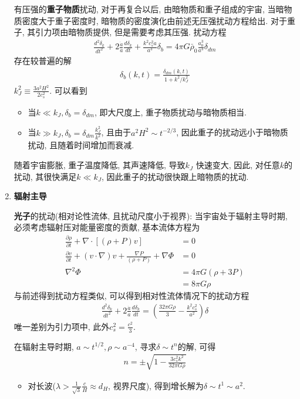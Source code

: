 \begin{enumerate}
    \subitem 有压强的\textbf{重子物质}扰动, 对于再复合以后, 由暗物质和重子组成的宇宙, 当暗物质密度大于重子密度时, 暗物质的密度演化由前述无压强扰动方程给出. 对于重子, 其引力项由暗物质提供, 但是需要考虑其压强. 扰动方程
    \begin{align*}
        \frac{d^2\delta_k}{d t^2}+2\frac{\dot{a}}{a}\frac{d\delta_k}{dt}+\frac{k^2c_s^2a}{a^3}\delta_b=4\pi G \bar\rho_0\frac{a_0^3}{a^3}\delta_{dm}
    \end{align*}
    存在较普遍的解
    \begin{align*}
        \delta_b(k,t)=\frac{\delta_{dm}(k,t)}{1+k^2/k_J^2}
    \end{align*}
    $\displaystyle k_J^2\equiv \frac{3a^2H^2}{2c_s^2}$. 可以看到
    \begin{itemize}
        \item 当$k\ll k_J, \delta_b=\delta_{dm}$, 即大尺度上, 重子物质扰动与暗物质相当. 
        \item 当$k\gg k_J, \delta_b=\delta_{dm}\frac{k_J^2}{k^2}$, 且由于$a^2H^2\sim t^{-2/3}$, 因此重子的扰动远小于暗物质扰动, 且随着时间增加而衰减. 
    \end{itemize}
    随着宇宙膨胀, 重子温度降低, 其声速降低, 导致$k_J$ 快速变大, 因此, 对任意$k$的扰动, 其很快满足$k\ll k_J$, 因此重子的扰动很快跟上暗物质的扰动. 
    \item \textbf{辐射主导}
    
    \subitem \textbf{光子}的扰动(相对论性流体, 且扰动尺度小于视界): 当宇宙处于辐射主导时期, 必须考虑辐射压对能量密度的贡献, 基本流体方程为
    \begin{align*}
        \frac{\partial \rho}{\partial t}+\nabla\cdot[(\rho+P)v]&=0\\
        \frac{\partial v}{\partial t}+(v\cdot \nabla)v+\frac{\nabla P}{(\rho+P)}+\nabla\Phi&=0\\
        \nabla^2\Phi&=4\pi G(\rho+3P)\\
        &=8\pi G\rho
    \end{align*}
    与前述得到扰动方程类似, 可以得到相对性流体情况下的扰动方程
    \begin{align*}
        \frac{d^2\delta_k}{d t^2}+2\frac{\dot{a}}{a}\frac{d\delta_k}{dt}=\left( \frac{32\pi G \rho}{3}-\frac{k^2c_s^2}{a^2} \right)\delta
    \end{align*}
    唯一差别为引力项中, 此外$c_s^2=\frac{c^2}{3}$. 

    在辐射主导时期, $a\sim t^{1/2}, \rho\sim a^{-4}$, 寻求$\delta\sim t^n$的解, 可得
    \begin{align*}
        n=\pm\sqrt{1-\frac{3c_s^2k^2}{32\pi G \rho}}
    \end{align*}
    \begin{itemize}
    \item 对长波($\lambda>\frac{1}{\sqrt{3}}\frac{c}{H}\approx d_H$, 视界尺度), 得到增长解为$\delta\sim t^1\sim a^2$. 


\end{itemize}
\end{enumerate}
